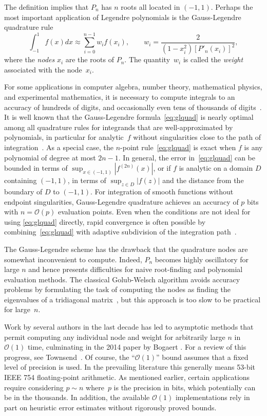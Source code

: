 \documentclass{siamart0216}
\newcommand{\OO}{\mathcal{O}}
\begin{document}
The definition implies that $P_n$ has $n$ roots all located in $(-1,1)$.
Perhaps the most important application of Legendre polynomials
is the Gauss-Legendre quadrature rule
\begin{equation}
\int_{-1}^{1} f(x) dx \approx \sum_{i=0}^{n-1} w_i f(x_i), \qquad
w_i = \frac{2}{(1-x_i^2) [P'_n(x_i)]^2},
\label{eq:glquad}
\end{equation}
where the \emph{nodes} $x_i$ are the roots of $P_n$.
The quantity~$w_i$ is called the \emph{weight} associated
with the node~$x_i$.

For some applications in computer algebra, number theory,
mathematical physics, and experimental mathematics,
it is necessary to compute integrals to an accuracy of
hundreds of digits, and occasionally even tens of
thousands of digits~\cite{bailey2011high}.
It is well known that the Gauss-Legendre formula~\eqref{eq:glquad} is nearly
optimal among all quadrature rules for integrands that are
well-approximated by polynomials, in particular for
analytic~$f$ without singularities close to
the path of integration~\cite{kowalski1985gauss,trefethen2008gauss}.
As a special case, the $n$-point rule~\eqref{eq:glquad} is exact
when $f$ is any polynomial of degree at most $2n-1$.
In general, the error in~\eqref{eq:glquad} can be bounded in terms of
$\sup_{x \in (-1,1)} |f^{(2n)}(x)|$, or if $f$ is analytic on a domain $D$
containing $(-1,1)$, in terms of $\sup_{z \in D} |f(z)|$
and the distance from the boundary of $D$ to $(-1,1)$.
For integration of smooth functions without endpoint singularities,
Gauss-Legendre quadrature achieves an accuracy of $p$ bits with $n = \OO(p)$
evaluation points.
Even when the conditions are not ideal for using \eqref{eq:glquad} directly,
rapid convergence is often possible
by combining~\eqref{eq:glquad}
with adaptive subdivision of the integration path~\cite{petras2002self}.

The Gauss-Legendre scheme has the drawback
that the quadrature nodes are
somewhat inconvenient to compute.
Indeed, $P_n$ becomes highly oscillatory for
large $n$ and hence presents difficulties
for naive root-finding and polynomial evaluation methods.
The classical Golub-Welsch algorithm avoids accuracy problems
by formulating the task of computing the nodes as
finding the eigenvalues of a tridiagonal matrix~\cite{golub1969calculation},
but this approach is too slow to be practical for large~$n$.

Work by several authors in the last decade has led to asymptotic methods
that permit computing any individual node and weight for arbitrarily large $n$
in $\OO(1)$ time, culminating in the 2014 paper by Bogaert \cite{bogaert2014iteration}.
For a review of this progress, see Townsend~\cite{townsend2015race}.
Of course, the ``$\OO(1)$'' bound assumes that a fixed
level of precision is used. In the prevailing literature
this generally means 53-bit IEEE 754 floating-point arithmetic.
As mentioned earlier, certain applications require
considering $p \sim n$ where~$p$ is the precision in bits,
which potentially can be in the thousands.
In addition, the available $\OO(1)$ implementations rely in part
on heuristic error estimates without rigorously proved bounds.
\end{document}
